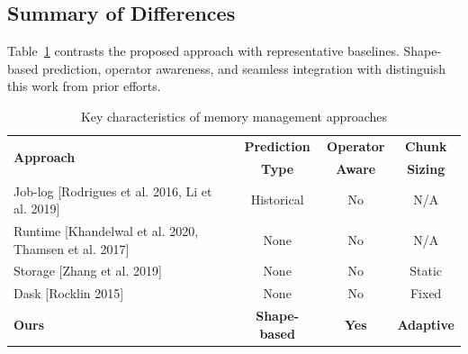 \subsection{Summary of Differences}

Table~\ref{tab:comparison} contrasts the proposed approach with representative baselines.
Shape-based prediction, operator awareness, and seamless integration with \dask distinguish this work from prior efforts.

\begin{table}[htb]
    \centering
    \caption{Key characteristics of memory management approaches}
    \label{tab:comparison}
    \begin{tabular}{p{7.5cm}ccc}
        \toprule
        \multirow{2}{*}{\textbf{Approach}} & \textbf{Prediction} & \textbf{Operator} & \textbf{Chunk} \\
        & \textbf{Type} & \textbf{Aware} & \textbf{Sizing} \\
        \midrule
        Job-log \newline
        \small{[Rodrigues et al. 2016, Li et al. 2019]} & Historical & No & N/A \\
        \addlinespace
        Runtime \newline
        \small{[Khandelwal et al. 2020, Thamsen et al. 2017]} & None & No & N/A \\
        \addlinespace
        Storage [Zhang et al. 2019] & None & No & Static \\
        \addlinespace
        Dask [Rocklin 2015] & None & No & Fixed \\
        \addlinespace
        \textbf{Ours} & \textbf{Shape-based} & \textbf{Yes} & \textbf{Adaptive} \\
        \bottomrule
    \end{tabular}
\end{table}